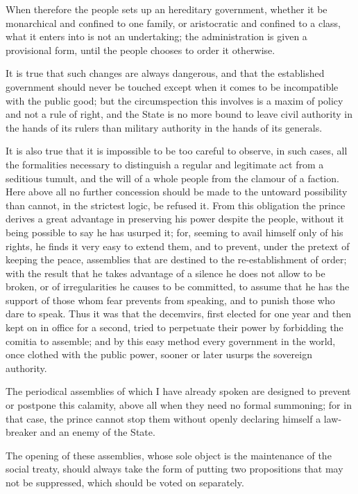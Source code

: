 \documentclass[12pt]{book}
\begin{document}
When therefore the people sets up an hereditary government, whether it be monarchical and confined to one family, or aristocratic and confined to a class, what it enters into is not an undertaking; the administration is given a provisional form, until the people chooses to order it otherwise.

It is true that such changes are always dangerous, and that the established government should never be touched except when it comes to be incompatible with the public good; but the circumspection this involves is a maxim of policy and not a rule of right, and the State is no more bound to leave civil authority in the hands of its rulers than military authority in the hands of its generals.

It is also true that it is impossible to be too careful to observe, in such cases, all the formalities necessary to distinguish a regular and legitimate act from a seditious tumult, and the will of a whole people from the clamour of a faction. Here above all no further concession should be made to the untoward possibility than cannot, in the strictest logic, be refused it. From this obligation the prince derives a great advantage in preserving his power despite the people, without it being possible to say he has usurped it; for, seeming to avail himself only of his rights, he finds it very easy to extend them, and to prevent, under the pretext of keeping the peace, assemblies that are destined to the re-establishment of order; with the result that he takes advantage of a silence he does not allow to be broken, or of irregularities he causes to be committed, to assume that he has the support of those whom fear prevents from speaking, and to punish those who dare to speak. Thus it was that the decemvirs, first elected for one year and then kept on in office for a second, tried to perpetuate their power by forbidding the comitia to assemble; and by this easy method every government in the world, once clothed with the public power, sooner or later usurps the sovereign authority.

The periodical assemblies of which I have already spoken are designed to prevent or postpone this calamity, above all when they need no formal summoning; for in that case, the prince cannot stop them without openly declaring himself a law-breaker and an enemy of the State.

The opening of these assemblies, whose sole object is the maintenance of the social treaty, should always take the form of putting two propositions that may not be suppressed, which should be voted on separately.
\end{document}

